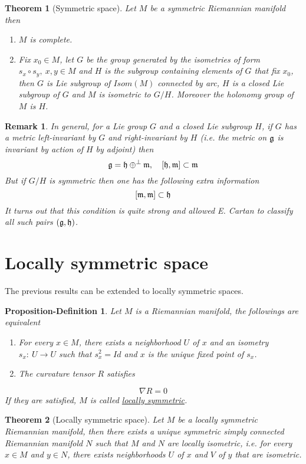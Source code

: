 \documentclass[11pt]{article}
\newtheorem{remark}{Remark}
\newtheorem{theorem}{Theorem}
\newtheorem{propdef}[definition]{Proposition-Definition}
\begin{document}
\begin{theorem}[Symmetric space]
\label{org5e40a8d} 
Let \(M\) be a symmetric Riemannian manifold then 
\begin{enumerate}
\item \(M\) is complete.
\item Fix \(x_0\in M\), let \(G\) be the group generated by the isometries of form \(s_x\circ s_y,\ x,y\in
   M\) and \(H\) is the subgroup containing elements of \(G\) that fix \(x_0\), then \(G\) is Lie subgroup of
\(Isom(M)\) connected by arc, \(H\) is a closed Lie subgroup of \(G\) and \(M\) is isometric to
\(G/H\). Moreover the holonomy group of \(M\) is \(H\).
\end{enumerate}
\end{theorem}

\begin{remark}
In general, for a Lie group \(G\) and a closed Lie subgroup \(H\), if \(G\) has a metric left-invariant by
\(G\) and right-invariant by \(H\) (i.e. the metric on \(\frak{g}\) is invariant by action of \(H\) by
adjoint) then 
\[ 
\frak{g} = \frak{h} \oplus^\perp \frak{m},\quad [\frak{h},\frak{m}]\subset \frak{m}
\] 
But if \(G/H\) is symmetric then one has the following extra information 
\[
[\frak{m},\frak{m}]\subset \frak{h} 
\] 
It turns out that this condition is quite strong and allowed E. Cartan to
classify all such pairs \((\frak{g},\frak{h})\).
\end{remark}

\section{Locally symmetric space}
\label{sec:org7980132}
The previous results can be extended to locally symmetric spaces.

\begin{propdef}
Let \(M\) is a Riemannian manifold, the followings are equivalent
\begin{enumerate}
\item For every \(x\in M\), there exists a neighborhood \(U\) of \(x\) and an isometry \(s_x:\
   U\longrightarrow U\) such that \(s_x^2=Id\) and \(x\) is the unique fixed point of \(s_x\).
\item The curvature tensor \(R\) satisfies
\end{enumerate}
\[
\nabla R = 0
\]
If they are satisfied, \(M\) is called  \uline{locally symmetric}.
\end{propdef}

\begin{theorem}[Locally symmetric space]
\label{orgec3332a}
Let \(M\) be a locally symmetric Riemannian manifold, then there exists a unique symmetric simply
connected Riemannian manifold \(N\) such that \(M\) and \(N\) are locally isometric, i.e. for every
\(x\in M\) and \(y\in N\), there exists neighborhoods \(U\) of \(x\) and \(V\) of \(y\) that are isometric.
\end{theorem}
\end{document}
